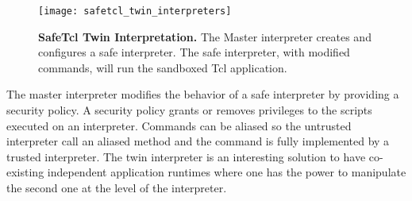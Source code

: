 \begin{figure}[ht]
\begin{center}
\texttt{[image: safetcl\_twin\_interpreters]}
\caption{\textbf{SafeTcl Twin Interpretation.} The Master interpreter creates and configures a safe interpreter. The safe interpreter, with modified commands, will run the sandboxed Tcl application.\label{fig:safetcl_twin_interpreters}
 }
\end{center}
\end{figure}

The master interpreter modifies the behavior of a safe interpreter by providing a security policy. A security policy grants or removes privileges to the scripts executed on an interpreter. Commands can be aliased so the untrusted interpreter call an aliased method and the command is fully implemented by a trusted interpreter. The twin interpreter is an interesting solution to have co-existing independent application runtimes where one has the power to manipulate the second one at the level of the interpreter.




